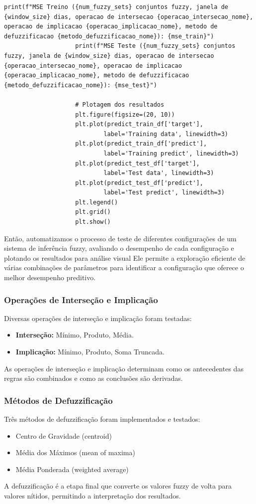 \documentclass[a4paper, 12pt]{article}
\begin{document}
\begin{lstlisting}[style=python]
                    print(f"MSE Treino ({num_fuzzy_sets} conjuntos fuzzy, janela de {window_size} dias, operacao de intersecao {operacao_intersecao_nome}, operacao de implicacao {operacao_implicacao_nome}, metodo de defuzzificacao {metodo_defuzzificacao_nome}): {mse_train}")
                    print(f"MSE Teste ({num_fuzzy_sets} conjuntos fuzzy, janela de {window_size} dias, operacao de intersecao {operacao_intersecao_nome}, operacao de implicacao {operacao_implicacao_nome}, metodo de defuzzificacao {metodo_defuzzificacao_nome}): {mse_test}")

                    # Plotagem dos resultados
                    plt.figure(figsize=(20, 10))
                    plt.plot(predict_train_df['target'],
                            label='Training data', linewidth=3)
                    plt.plot(predict_train_df['predict'],
                            label='Training predict', linewidth=3)
                    plt.plot(predict_test_df['target'],
                            label='Test data', linewidth=3)
                    plt.plot(predict_test_df['predict'],
                            label='Test predict', linewidth=3)
                    plt.legend()
                    plt.grid()
                    plt.show()
\end{lstlisting}

Então, automatizamos o processo de teste de diferentes configurações de um sistema de inferência fuzzy, avaliando o desempenho de cada configuração e plotando os resultados para análise visual Ele permite a exploração eficiente de várias combinações de parâmetros para identificar a configuração que oferece o melhor desempenho preditivo.


\subsubsection{Operações de Interseção e Implicação}
Diversas operações de interseção e implicação foram testadas:
\begin{itemize}
    \item \textbf{Interseção:} Mínimo, Produto, Média.
    \item \textbf{Implicação:} Mínimo, Produto, Soma Truncada.
\end{itemize}
As operações de interseção e implicação determinam como os antecedentes das regras são combinados e como as conclusões são derivadas.

\subsubsection{Métodos de Defuzzificação}
Três métodos de defuzzificação foram implementados e testados:
\begin{itemize}
    \item Centro de Gravidade (centroid)
    \item Média dos Máximos (mean of maxima)
    \item Média Ponderada (weighted average)
\end{itemize}
A defuzzificação é a etapa final que converte os valores fuzzy de volta para valores nítidos, permitindo a interpretação dos resultados.
\end{document}
